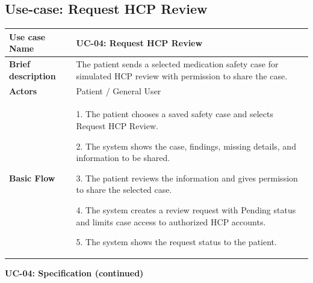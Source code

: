\clearpage
\subsection{Use-case: Request HCP Review}
\label{uc:uc-04}

\begin{longtable}{|p{}|p{}|}
\hline
\textbf{Use case Name} & UC-04: Request HCP Review \\ \hline
\textbf{Brief description} & The patient sends a selected medication safety case for simulated HCP review with permission to share the case. \\ \hline
\textbf{Actors} & Patient / General User \\ \hline
\textbf{Basic Flow} &
1. The patient chooses a saved safety case and selects Request HCP Review.\par
2. The system shows the case, findings, missing details, and information to be shared.\par
3. The patient reviews the information and gives permission to share the selected case.\par
4. The system creates a review request with Pending status and limits case access to authorized HCP accounts.\par
5. The system shows the request status to the patient.
\\ \hline
\end{longtable}
\clearpage
\noindent\textbf{UC-04: Specification (continued)}
